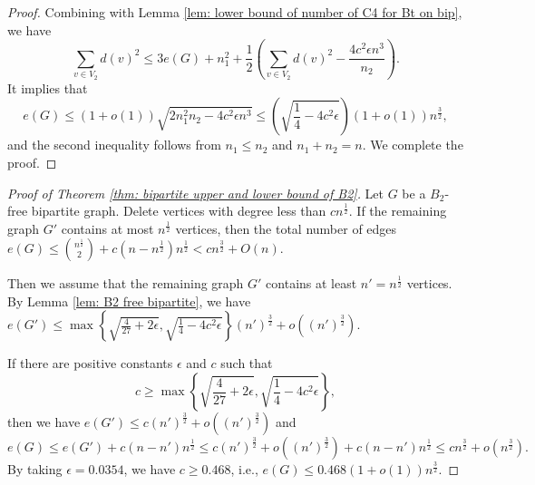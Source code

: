 \documentclass[11pt,a4paper]{article}
\theoremstyle{definition}
\begin{document}
\begin{proof}
            Combining with Lemma \ref{lem: lower bound of number of C4 for Bt on bip}, we have
            $$\sum_{v\in V_2}d(v)^2\leq 3e(G)+n_1^2+\frac{1}{2} \left(\sum_{v\in V_2}d(v)^2- \frac{4c^2\epsilon n^{3}}{n_2} \right).$$
            It implies that
            $$e(G)\leq (1+o(1))\sqrt{2n_1^2n_2-4c^2\epsilon n^3}\leq \left(\sqrt{\frac{1}{4}-4c^2\epsilon}\right) (1+ o(1)) n^{\frac{3}{2}},$$
            and the second inequality follows from $n_1 \leq n_2$ and $n_1 + n_2 = n$.
            We complete the proof.
        \end{proof}

        \begin{proof}[Proof of Theorem \ref{thm: bipartite upper and lower bound of B2}]
            Let $G$ be a $B_2$-free bipartite graph.
            Delete vertices with degree less than $cn^{\frac{1}{2}}$.
            If the remaining graph $G'$ contains at most $n^{\frac{1}{2}}$ vertices, then the total number of edges $e(G) \leq \binom{n^{\frac{1}{2}}}{2} + c (n-n^{\frac{1}{2}})n^{\frac{1}{2}} < cn^{\frac{3}{2}} + O(n)$.

            Then we assume that the remaining graph $G'$ contains at least $n' = n^{\frac{1}{2}}$ vertices.
            By Lemma \ref{lem: B2 free bipartite}, we have $e(G') \leq \max\left\{\sqrt{\frac{4}{27}+2\epsilon},\sqrt{\frac{1}{4}-4c^2\epsilon}\right\}(n')^{\frac{3}{2}}+o((n')^{\frac{3}{2}}).$

            If there are positive constants $\epsilon$ and $c$ such that
            $$c \geq \max\left\{ \sqrt{\frac{4}{27}+2\epsilon},\sqrt{\frac{1}{4}-4c^2\epsilon}\right\},$$
            then we have $e(G')\leq c(n')^{\frac{3}{2}}+o((n')^{\frac{3}{2}})$ and
            \begin{equation*}
                e(G) \leq e(G') + c(n - n')n^{\frac{1}{2}} \leq c(n')^{\frac{3}{2}}+o((n')^{\frac{3}{2}}) + c(n - n')n^{\frac{1}{2}} \leq cn^{\frac{3}{2}} + o(n^{\frac{3}{2}}).
            \end{equation*}
            By taking $\epsilon = 0.0354$, we have $c\geq  0.468$, i.e., $e(G) \leq 0.468 (1+o(1)) n^{\frac{3}{2}}$.
        \end{proof}
\end{document}
